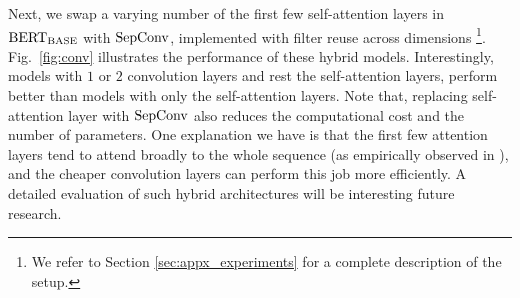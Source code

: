 

Next, we swap a varying number of the first few self-attention layers in $\text{BERT}_{\text{BASE}}$ with ${\rm SepConv}$, implemented with filter reuse across dimensions \citep{wu2019pay}\footnote{We refer to Section \ref{sec:appx_experiments} for a complete description of the setup.}. Fig.~\ref{fig:conv} illustrates the performance of these hybrid models.  Interestingly, models with $1$ or $2$ convolution layers and rest the self-attention layers, perform better than models with only the self-attention layers.
Note that, replacing self-attention layer with ${\rm SepConv}$ also reduces the computational cost and the number of parameters. 
One explanation we have is that the first few attention layers tend to attend broadly to the whole sequence (as empirically observed in \citep{clark2019does}), and the cheaper convolution layers can perform this job more efficiently. A detailed evaluation of such hybrid architectures will be interesting future research.

